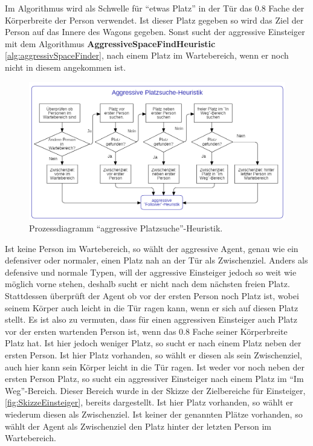Im Algorithmus wird als Schwelle für "`etwas Platz"' in der Tür das 0.8 Fache der Körperbreite der Person verwendet. Ist dieser Platz gegeben so wird das Ziel der Person auf das Innere des Wagons gegeben. Sonst sucht der aggressive Einsteiger mit dem Algorithmus \textbf{AggressiveSpaceFindHeuristic} \ref{alg:aggressivSpaceFinder}, nach einem Platz im Wartebereich, wenn er noch nicht in diesem angekommen ist.

\begin{figure}[H]
	\centering
		\includegraphics[width=1.0\textwidth]{pictures/model/algorithm/boarding/aggressive_boarding/aggressive_space_find_heuristic.png}
	\caption{Prozessdiagramm "`aggressive Platzsuche"'-Heuristik.}
	\label{fig:APH}
\end{figure}
Ist keine Person im Wartebereich, so wählt der aggressive Agent, genau wie ein defensiver oder normaler, einen Platz nah an der Tür als Zwischenziel. Anders als defensive und normale Typen, will der aggressive Einsteiger jedoch so weit wie möglich vorne stehen, deshalb sucht er nicht nach dem nächsten freien Platz. Stattdessen überprüft der Agent ob vor der ersten Person noch Platz ist, wobei seinem Körper auch leicht in die Tür ragen kann, wenn er sich auf diesen Platz stellt. Es ist also zu vermuten, dass für einen aggressiven Einsteiger auch Platz vor der ersten wartenden Person ist, wenn das 0.8 Fache seiner Körperbreite Platz hat. Ist hier jedoch weniger Platz, so sucht er nach einem Platz neben der ersten Person. Ist hier Platz vorhanden, so wählt er diesen als sein Zwischenziel, auch hier kann sein Körper leicht in die Tür ragen. Ist weder vor noch neben der ersten Person Platz, so sucht ein aggressiver Einsteiger nach einem Platz im "`Im Weg"'-Bereich. Dieser Bereich wurde in der Skizze der Zielbereiche für Einsteiger, \figurename \ref{fig:SkizzeEinsteiger}, bereits dargestellt. Ist hier Platz vorhanden, so wählt er wiederum diesen als Zwischenziel. Ist keiner der genannten Plätze vorhanden, so wählt der Agent als Zwischenziel den Platz hinter der letzten Person im Wartebereich. 
